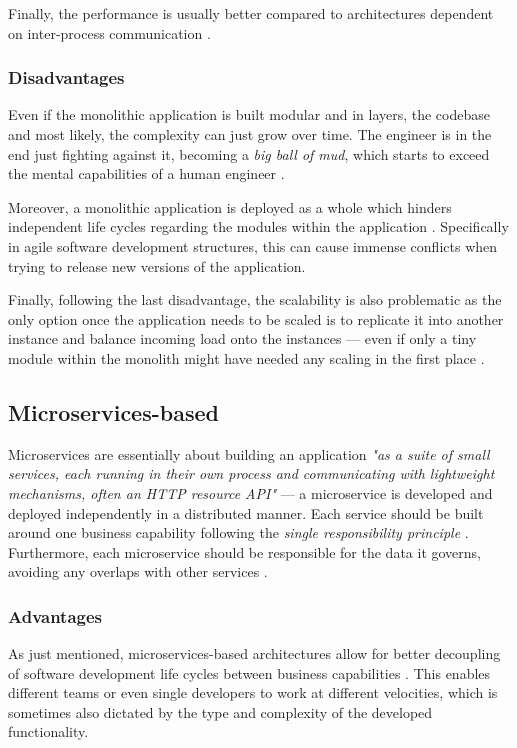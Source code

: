 \documentclass[12pt,a4paper]{report}
\begin{document}
Finally, the performance is usually better compared to architectures dependent
on inter-process communication \cite{knoche2016sustaining}.


\subsubsection{Disadvantages}
Even if the monolithic application is built
modular and in layers, the codebase and most likely, the complexity can just
grow over time. The engineer is in the end just fighting against it, becoming a
\textit{big ball of mud}, which starts to exceed the mental capabilities of a
human engineer \cite{newman2015building, foote1997bigballofmud, france2007model}.

Moreover, a monolithic application is deployed as a whole which hinders
independent life cycles regarding the modules within the application \cite{ms-fowler}.
Specifically in agile software development structures, this can cause
immense conflicts when trying to release new versions of the application.

Finally, following the last disadvantage, the scalability is also problematic
as the only option once the application needs to be scaled is to replicate it
into another instance and balance incoming load onto the instances --- even if
only a tiny module within the monolith might have needed any scaling in the
first place \cite{ms-fowler, newman2015building}.


\subsection{Microservices\hyp based}

Microservices are essentially about building an application \textit{"as a suite
of small services, each running in their own process and communicating with
lightweight mechanisms, often an HTTP resource API"} \cite{ms-fowler} --- a
microservice is developed and deployed independently in a distributed manner.
Each service should be built around one business capability following the
\textit{single responsibility principle} \cite{newman2015building,
martin2003agile}. Furthermore, each microservice should be responsible for the
data it governs, avoiding any overlaps with other services \cite{ms-fowler}.

\subsubsection{Advantages} As just mentioned, microservices\hyp based
architectures allow for better decoupling of software development life cycles
between business capabilities \cite{ms-fowler}. This enables different teams or
even single developers to work at different velocities, which is sometimes also
dictated by the type and complexity of the developed functionality.
\end{document}
